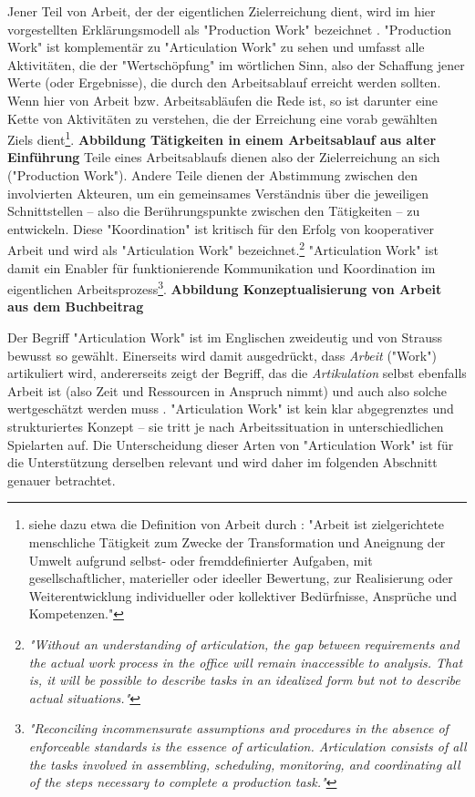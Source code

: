 Jener Teil von Arbeit, der der eigentlichen Zielerreichung dient, wird im hier vorgestellten Erklärungsmodell als "Production Work" bezeichnet \citep{Fujimura87}. "Production Work" ist komplementär zu "Articulation Work" zu sehen und umfasst alle Aktivitäten, die der "Wertschöpfung" im wörtlichen Sinn, also der Schaffung jener Werte (oder Ergebnisse), die durch den Arbeitsablauf erreicht werden sollten. Wenn hier von Arbeit bzw. Arbeitsabläufen die Rede ist, so ist darunter eine Kette von Aktivitäten zu verstehen, die der Erreichung eine vorab gewählten Ziels dient\footnote{siehe dazu etwa die Definition von Arbeit durch \citet{Semmer04}: "Arbeit ist zielgerichtete menschliche Tätigkeit zum Zwecke der Transformation und Aneignung der Umwelt aufgrund selbst- oder fremddefinierter Aufgaben, mit gesellschaftlicher, materieller oder ideeller Bewertung, zur Realisierung oder Weiterentwicklung individueller oder kollektiver Bedürfnisse, Ansprüche und Kompetenzen."}. \textbf{Abbildung Tätigkeiten in einem Arbeitsablauf aus alter Einführung} Teile eines Arbeitsablaufs dienen also der Zielerreichung an sich ("Production Work"). Andere Teile dienen der Abstimmung zwischen den involvierten Akteuren, um ein gemeinsames Verständnis über die jeweiligen Schnittstellen – also die Berührungspunkte zwischen den Tätigkeiten – zu entwickeln. Diese "Koordination" ist kritisch für den Erfolg von kooperativer Arbeit \citep{Strauss93} und wird als "Articulation Work" bezeichnet.\footnote{\emph{"Without an understanding of articulation, the gap between requirements and the actual work process in the office will remain inaccessible to analysis. That is, it will be possible to describe tasks in an idealized form but not to describe actual situations."}\citep{Gerson86}} "Articulation Work" ist damit ein Enabler für funktionierende Kommunikation und Koordination im eigentlichen Arbeitsprozess\footnote{\emph{"Reconciling incommensurate assumptions and procedures in the absence of enforceable standards is the essence of articulation. Articulation consists of all the tasks involved in assembling, scheduling, monitoring, and coordinating all of the steps necessary to complete a production task."}\citep{Gerson86}}. \textbf{Abbildung Konzeptualisierung von Arbeit aus dem Buchbeitrag}

Der Begriff "Articulation Work" ist im Englischen zweideutig und von Strauss bewusst so gewählt. Einerseits wird damit ausgedrückt, dass \emph{Arbeit} ("Work") artikuliert wird, andererseits zeigt der Begriff, das die \emph{Artikulation} selbst ebenfalls Arbeit ist (also Zeit und Ressourcen in Anspruch nimmt) und auch also solche wertgeschätzt werden muss \citep{Fujimura87}. "Articulation Work" ist kein klar abgegrenztes und strukturiertes Konzept – sie tritt je nach Arbeitssituation in unterschiedlichen Spielarten auf. Die Unterscheidung dieser Arten von "Articulation Work" ist für die Unterstützung derselben relevant und wird daher im folgenden Abschnitt genauer betrachtet.

